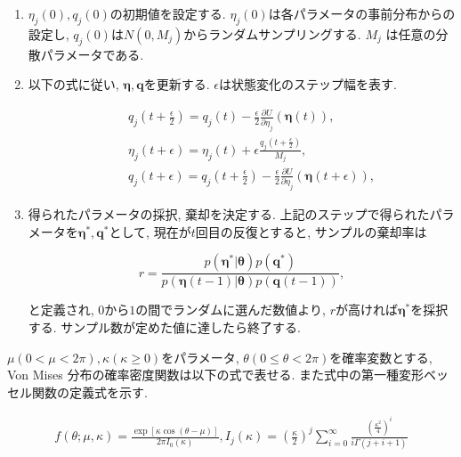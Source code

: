 \documentclass[a4paper,11pt]{jarticle}
\begin{document}
\begin{enumerate}

\item{}
$\eta_j(0), q_j(0)$の初期値を設定する. $\eta_j(0)$は各パラメータの事前分布からの設定し, $q_j(0)$は$N(0,M_j)$からランダムサンプリングする. $M_j$ は任意の分散パラメータである. 
 
\item{}

以下の式に従い, $\bm \eta, \bm q$を更新する. $\epsilon$は状態変化のステップ幅を表す.

\begin{eqnarray*}
&&q_j(t+\frac{\epsilon}{2}) = q_j(t) - \frac{\epsilon}{2} \frac{\partial U}{\partial \eta_j} (\bm \eta(t)), \\
&&\eta_j(t+\epsilon) = \eta_j(t) + \epsilon \frac{q_j(t + \frac{\epsilon}{2})}{M_j}, \\
&&q_j(t+\epsilon) = q_j(t+\frac{\epsilon}{2}) - \frac{\epsilon}{2} \frac{\partial U}{\partial \eta_j} (\bm \eta(t + \epsilon)),
\end{eqnarray*}

\item{}
得られたパラメータの採択, 棄却を決定する. 上記のステップで得られたパラメータを$\bm \eta^*, \bm q^*$として,
現在が$t$回目の反復とすると, サンプルの棄却率は

$$ r = \frac{p(\bm \eta^*|\bm \theta) p(\bm q^*)}{p(\bm \eta(t-1)|\bm \theta) p(\bm q(t-1))},$$

と定義され, $0$から$1$の間でランダムに選んだ数値より, $r$が高ければ$\bm \eta^*$を採択する. サンプル数が定めた値に達したら終了する. 

\end{enumerate}

$\mu(0 < \mu < 2\pi), \kappa(\kappa \geq 0) $をパラメータ, $\theta(0 \leq \theta < 2\pi)$を確率変数とする, Von Mises 分布の確率密度関数は以下の式で表せる. また式中の第一種変形ベッセル関数の定義式を示す.

\vspace{-1zh}
\begin{eqnarray*}
f(\theta;\mu, \kappa) = \frac{\exp[\kappa \cos(\theta - \mu)]}{2 \pi I_0(\kappa)} , I_j(\kappa) = \left(\frac{\kappa}{2}\right)^j \sum^\infty_{i=0} \frac{\left(\frac{\kappa^2}{4}\right)^i}{i \Gamma(j + i + 1)}
\end{eqnarray*}
\end{document}
